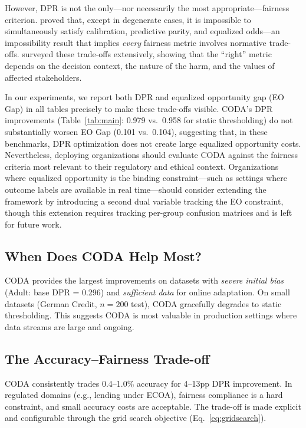 \documentclass[letterpaper]{article} %
\theoremstyle{definition}
\begin{document}
However, DPR is not the only---nor necessarily the most appropriate---fairness criterion. \citet{chouldechova2017fair} proved that, except in degenerate cases, it is impossible to simultaneously satisfy calibration, predictive parity, and equalized odds---an impossibility result that implies \emph{every} fairness metric involves normative trade-offs. \citet{corbettdavies2018measure} surveyed these trade-offs extensively, showing that the ``right'' metric depends on the decision context, the nature of the harm, and the values of affected stakeholders.

In our experiments, we report both DPR and equalized opportunity gap (EO Gap) in all tables precisely to make these trade-offs visible. CODA's DPR improvements (Table~\ref{tab:main}: 0.979 vs.\ 0.958 for static thresholding) do not substantially worsen EO Gap (0.101 vs.\ 0.104), suggesting that, in these benchmarks, DPR optimization does not create large equalized opportunity costs. Nevertheless, deploying organizations should evaluate CODA against the fairness criteria most relevant to their regulatory and ethical context. Organizations where equalized opportunity is the binding constraint---such as settings where outcome labels are available in real time---should consider extending the framework by introducing a second dual variable tracking the EO constraint, though this extension requires tracking per-group confusion matrices and is left for future work.

\subsection{When Does CODA Help Most?}
CODA provides the largest improvements on datasets with \emph{severe initial bias} (Adult: base DPR = 0.296) and \emph{sufficient data} for online adaptation. On small datasets (German Credit, $n=200$ test), CODA gracefully degrades to static thresholding. This suggests CODA is most valuable in production settings where data streams are large and ongoing.

\subsection{The Accuracy--Fairness Trade-off}
CODA consistently trades 0.4--1.0\% accuracy for 4--13pp DPR improvement. In regulated domains (e.g., lending under ECOA), fairness compliance is a hard constraint, and small accuracy costs are acceptable. The trade-off is made explicit and configurable through the grid search objective (Eq.~\ref{eq:gridsearch}).
\end{document}
